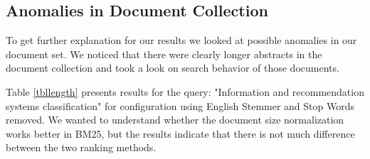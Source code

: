 \documentclass[report,draft*]{aaltoseries}
\begin{document}
\subsection{Anomalies in Document Collection}
To get further explanation for our results we looked at possible anomalies in our document set. We noticed that there were clearly longer abstracts in the document collection and took a look on search behavior of those documents. 
\begin{table}[]
\centering
\caption{Impact of document length on ranking methods}
\label{tbllength}
\end{table}
Table \ref{tbllength} presents results for the query: "Information and recommendation systems classification" for configuration using English Stemmer and Stop Words removed. We wanted to understand whether the document size normalization works better in BM25, but the results indicate that there is not much difference between the two ranking methods. 
\end{document}
